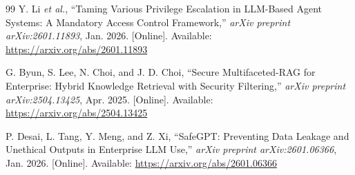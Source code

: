 \documentclass[journal]{IEEEtran}
\begin{document}
\begin{thebibliography}{99}
Y. Li \textit{et al.}, ``Taming Various Privilege Escalation in LLM-Based Agent Systems: A Mandatory Access Control Framework,'' \textit{arXiv preprint arXiv:2601.11893}, Jan. 2026. [Online]. Available: \url{https://arxiv.org/abs/2601.11893}

G. Byun, S. Lee, N. Choi, and J. D. Choi, ``Secure Multifaceted-RAG for Enterprise: Hybrid Knowledge Retrieval with Security Filtering,'' \textit{arXiv preprint arXiv:2504.13425}, Apr. 2025. [Online]. Available: \url{https://arxiv.org/abs/2504.13425}

P. Desai, L. Tang, Y. Meng, and Z. Xi, ``SafeGPT: Preventing Data Leakage and Unethical Outputs in Enterprise LLM Use,'' \textit{arXiv preprint arXiv:2601.06366}, Jan. 2026. [Online]. Available: \url{https://arxiv.org/abs/2601.06366}

\end{thebibliography}


\end{document}

